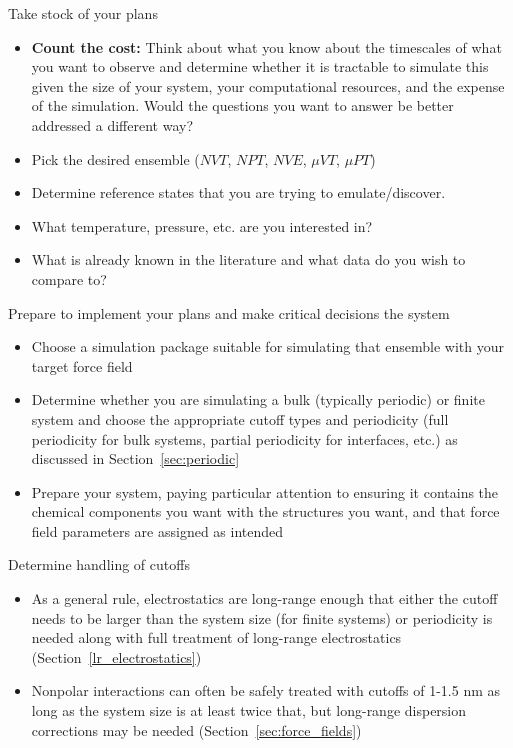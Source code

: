 \documentclass[9pt,bestpractices]{livecoms}
\begin{document}
\begin{Checklists*}[p!]

\begin{checklist}{Take stock of your plans}

\begin{itemize}
\item \textbf{Count the cost: } Think about what you know about the timescales of what you want to observe and determine whether it is tractable to simulate this given the size of your system, your computational resources, and the expense of the simulation. Would the questions you want to answer be better addressed a different way?
\item Pick the desired ensemble ($NVT$, $NPT$, $NVE$, $\mu VT$, $\mu PT$)
\item Determine reference states that you are trying to emulate/discover.
\item What temperature, pressure, etc. are you interested in?
\item What is already known in the literature and what data do you wish to compare to?
\end{itemize}
\end{checklist}

\begin{checklist}{Prepare to implement your plans and make critical decisions the system}

\begin{itemize}
\item Choose a simulation package suitable for simulating that ensemble with your target force field
\item Determine whether you are simulating a bulk (typically periodic) or finite system and choose the appropriate cutoff types and periodicity (full periodicity for bulk systems, partial periodicity for interfaces, etc.) as discussed in Section~\ref{sec:periodic}
\item Prepare your system, paying particular attention to ensuring it contains the chemical components you want with the structures you want, and that force field parameters are assigned as intended
\end{itemize}
\end{checklist}

\begin{checklist}{Determine handling of cutoffs}
\begin{itemize}
\item As a general rule, electrostatics are long-range enough that either the cutoff needs to be larger than the system size (for finite systems) or
periodicity is needed along with full treatment of long-range electrostatics (Section~\ref{lr_electrostatics})
\item Nonpolar interactions can often be safely treated with cutoffs of 1-1.5 nm as long as the system size is at least twice that, but long-range dispersion corrections may be needed (Section~\ref{sec:force_fields})
\end{itemize}
\end{checklist}


\end{Checklists*}
\end{document}
